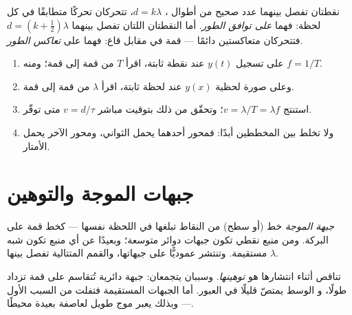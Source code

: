 \begin{definition}\label{def:g12:mechanical-waves:phase}
نقطتان تفصل بينهما عدد صحيح من أطوال ، $d = k\lambda$،
تتحركان تحركًا متطابقًا في كل لحظة: فهما
\emph{على توافق الطور}. أما النقطتان اللتان تفصل بينهما
$d = (k + \tfrac12)\lambda$ فتتحركان متعاكستين دائمًا --- قمة في مقابل
قاع: فهما على \emph{تعاكس الطور}.
\end{definition}

\begin{method}\label{met:g12:mechanical-waves:reading}
\begin{enumerate}
  \item على تسجيل $y(t)$ عند نقطة ثابتة، اقرأ $T$ من قمة
        إلى قمة؛ ومنه $f = 1/T$.
  \item وعلى صورة لحظية $y(x)$ عند لحظة ثابتة، اقرأ $\lambda$ من قمة
        إلى قمة.
  \item استنتج $v = \lambda/T = \lambda f$؛ وتحقّق من ذلك بتوقيت
        مباشر $v = d/\tau$ متى توفّر.
  \item ولا تخلط بين المخططين أبدًا: فمحور أحدهما يحمل الثواني، ومحور
        الآخر يحمل الأمتار.
\end{enumerate}
\end{method}

\section{جبهات الموجة والتوهين}

\begin{definition}\label{def:g12:mechanical-waves:wavefront}
\emph{جبهة الموجة} خط (أو سطح) من النقاط
تبلغها  في اللحظة نفسها --- كخط قمة على
البركة. ومن منبع نقطي تكون جبهات  دوائر متوسعة؛ وبعيدًا
عن أي منبع تكون شبه مستقيمة. وتنتشر 
عموديًّا على جبهاتها، والقمم المتتالية تفصل بينها $\lambda$.
\end{definition}

\begin{definition}[التوهين]\label{def:g12:mechanical-waves:attenuation}
تناقص   أثناء انتشارها هو
\emph{توهينها}. وسببان يتجمعان: 
جبهة  دائرية تُتقاسم على قمة تزداد طولًا، و
الوسط يمتصّ قليلًا في العبور. أما الجبهات المستقيمة فتفلت من السبب
الأول --- وبذلك يعبر موج طويل لعاصفة بعيدة محيطًا.
\end{definition}

